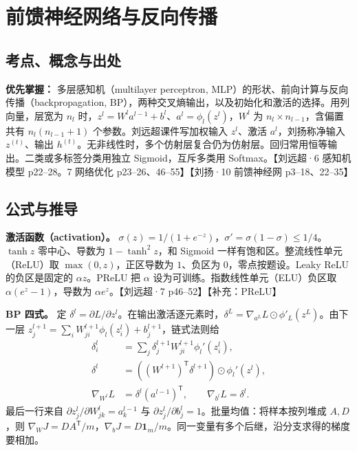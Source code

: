 \documentclass[UTF8,a4paper,zihao=-4,fontset=fandol]{ctexart}
\begin{document}
\section{前馈神经网络与反向传播}
\subsection{考点、概念与出处}

\textbf{优先掌握：} 多层感知机（multilayer perceptron, MLP）的形状、前向计算与反向传播（backpropagation, BP），两种交叉熵输出，以及初始化和激活的选择。用列向量，层宽为 $n_l$ 时，$z^l=W^la^{l-1}+b^l$、$a^l=\phi_l(z^l)$，$W^l$ 为 $n_l\times n_{l-1}$，含偏置共有 $n_l(n_{l-1}+1)$ 个参数。刘远超课件写加权输入 $z^l$、激活 $a^l$，刘扬称净输入 $z^{(t)}$、输出 $h^{(t)}$。无非线性时，多个仿射层复合仍为仿射层。回归常用恒等输出。二类或多标签分类用独立 Sigmoid，互斥多类用 Softmax。【刘远超·6 感知机模型 p22--28。7 网络优化 p23--26、46--55】【刘扬·10 前馈神经网 p3--18、22--35】

\subsection{公式与推导}

\textbf{激活函数（activation）。}
$\sigma(z)=1/(1+e^{-z})$，$\sigma'=\sigma(1-\sigma)\le1/4$。$\tanh z$ 零中心、导数为 $1-\tanh^2z$，和 Sigmoid 一样有饱和区。整流线性单元（ReLU）取 $\max(0,z)$，正区导数为 $1$、负区为 $0$，零点按题设。Leaky ReLU 的负区是固定的 $\alpha z$。PReLU 把 $\alpha$ 设为可训练。指数线性单元（ELU）负区取 $\alpha(e^z-1)$，导数为 $\alpha e^z$。【刘远超·7 p46--52】【补充：PReLU】

\textbf{BP 四式。} 定 $\delta^l=\partial L/\partial z^l$。在输出激活逐元素时，$\delta^L=\nabla_{a^L}L\odot\phi'_L(z^L)$。由下一层 $z_j^{l+1}=\sum_i W_{ji}^{l+1}\phi_l(z_i^l)+b_j^{l+1}$，链式法则给
\begin{align*}
 \delta_i^l
 &=\sum_j\delta_j^{l+1}W_{ji}^{l+1}\phi_l'(z_i^l),\\
 \delta^l&=((W^{l+1})^{\mathsf T}\delta^{l+1})\odot\phi_l'(z^l),\\
 \nabla_{W^l} L&=\delta^l(a^{l-1})^{\mathsf T},
 \qquad \nabla_{b^l}L=\delta^l .
\end{align*}
最后一行来自 $\partial z_j^l/\partial W_{jk}^l=a_k^{l-1}$ 与 $\partial z_j^l/\partial b_j^l=1$。批量均值：将样本按列堆成 $A,D$，则 $\nabla_W J=DA^{\mathsf T}/m$，$\nabla_b J=D\mathbf 1_m/m$。同一变量有多个后继，沿分支求得的梯度要相加。
\end{document}
